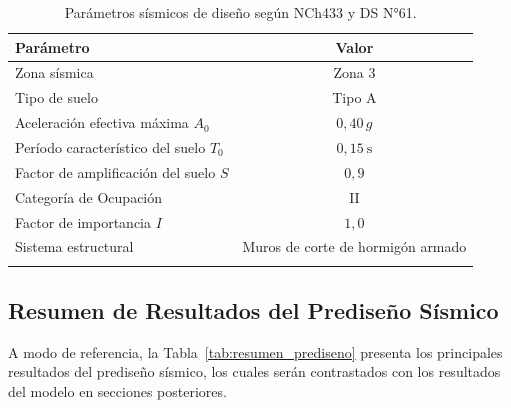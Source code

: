 \begin{table}[H]
    \centering
    \caption{Parámetros sísmicos de diseño según NCh433 y DS N°61.}
    
    \label{tab:parametros_sismicos}
    \begin{tabular}{lc}
        \toprule
        \textbf{Parámetro}                                  & \textbf{Valor} \\
        \midrule
        Zona sísmica                                        & Zona 3 \\
        Tipo de suelo                                       & Tipo A \\
        Aceleración efectiva máxima $A_0$                   & $0{,}40\,g$ \\
        Período característico del suelo $T_0$              & $0{,}15\ \text{s}$ \\
        Factor de amplificación del suelo $S$               & $0{,}9$ \\
        Categoría de Ocupación                              & II \\
        Factor de importancia $I$                           & $1{,}0$ \\
        Sistema estructural                                 & Muros de corte de hormigón armado \\
        \bottomrule
        \vspace{0.001cm}
    \end{tabular}
\end{table}

\subsection{Resumen de Resultados del Prediseño Sísmico}

A modo de referencia, la Tabla~\ref{tab:resumen_prediseno} presenta los principales 
resultados del prediseño sísmico, los cuales serán contrastados con los resultados 
del modelo en secciones posteriores.

